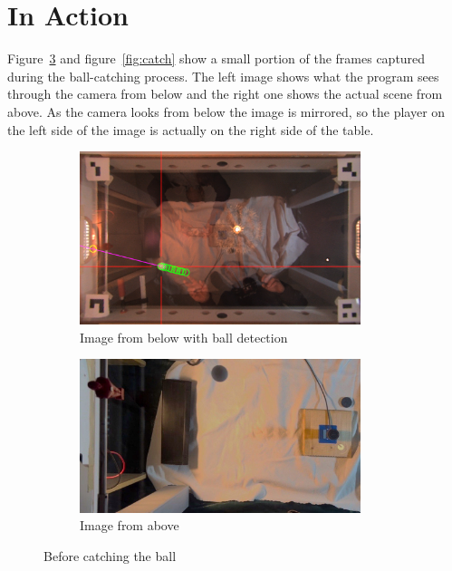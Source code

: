 \section{In Action}\label{sec:in-action}
Figure~\ref{fig:before_catch} and figure~\ref{fig:catch} show a small portion of the frames captured during the ball-catching process.
The left image shows what the program sees through the camera from below and the right one shows the actual scene from above.
As the camera looks from below the image is mirrored, so the player on the left side of the image is actually on the right side of the table.
\begin{figure}[H]
    \centering
    \begin{subfigure}{.5\textwidth}
        \centering
        \includegraphics[width=0.9\textwidth]{../photos/player_before_catch_bottom}
        \caption{Image from below with ball detection}
        \label{fig:player_before_catch_bottom}
    \end{subfigure}%
    \begin{subfigure}{.5\textwidth}
        \centering
        \includegraphics[width=0.9\textwidth]{../photos/before_catch_top}
        \caption{Image from above}
        \label{fig:before_catch_top}
    \end{subfigure}
    \caption{Before catching the ball}
    \label{fig:before_catch}
\end{figure}


